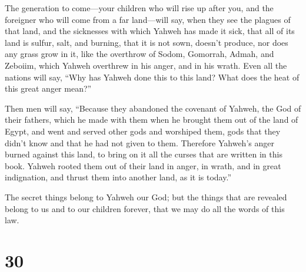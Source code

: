  The generation to come---your children who will rise up
after you, and the foreigner who will come from a far land---will say,
when they see the plagues of that land, and the sicknesses with which
Yahweh has made it sick,  that all of its land is sulfur,
salt, and burning, that it is not sown, doesn't produce, nor does any
grass grow in it, like the overthrow of Sodom, Gomorrah, Admah, and
Zeboiim, which Yahweh overthrew in his anger, and in his wrath.
 Even all the nations will say, ``Why has Yahweh done
this to this land? What does the heat of this great anger mean?''

 Then men will say, ``Because they abandoned the covenant
of Yahweh, the God of their fathers, which he made with them when he
brought them out of the land of Egypt,  and went and
served other gods and worshiped them, gods that they didn't know and
that he had not given to them.  Therefore Yahweh's anger
burned against this land, to bring on it all the curses that are written
in this book.  Yahweh rooted them out of their land in
anger, in wrath, and in great indignation, and thrust them into another
land, as it is today.''

 The secret things belong to Yahweh our God; but the
things that are revealed belong to us and to our children forever, that
we may do all the words of this law.

\hypertarget{section-29}{%
\section{30}\label{section-29}}

